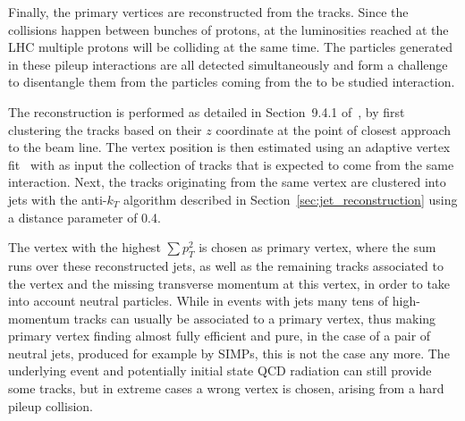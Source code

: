 Finally, the primary vertices are reconstructed from the tracks. Since the collisions happen between bunches of protons, at the luminosities reached at the \ac{LHC} multiple protons will be colliding at the same time. The particles generated in these pileup interactions are all detected simultaneously and form a challenge to disentangle them from the particles coming from the to be studied interaction.


The reconstruction is performed as detailed in Section~9.4.1 of~\cite{CMSCollaboration:2015zni}, by first clustering the tracks based on their $z$ coordinate at the point of closest approach to the beam line. The vertex position is then estimated using an adaptive vertex fit~\cite{Fruhwirth:2007hz} with as input the collection of tracks that is expected to come from the same interaction. Next, the tracks originating from the same vertex are clustered into jets with the anti-$k_T$ algorithm described in Section~\ref{sec:jet_reconstruction} using a distance parameter of 0.4.


The vertex with the highest $\sum p_T^2$ is chosen as primary vertex, where the sum runs over these reconstructed jets, as well as the remaining tracks associated to the vertex and the missing transverse momentum at this vertex, in order to take into account neutral particles.
While in events with jets many tens of high-momentum tracks can usually be associated to a primary vertex, thus making primary vertex finding almost fully efficient and pure, in the case of a pair of neutral jets, produced for example by \acp{SIMP}, this is not the case any more. The underlying event and potentially initial state \acs{QCD} radiation can still provide some tracks, but in extreme cases a wrong vertex is chosen, arising from a hard pileup collision.

